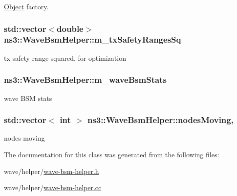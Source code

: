 \hyperlink{classns3_1_1Object}{Object} factory. 

\subsubsection[{\texorpdfstring{m\+\_\+tx\+Safety\+Ranges\+Sq}{m_txSafetyRangesSq}}]{\setlength{\rightskip}{0pt plus 5cm}std\+::vector$<$double$>$ ns3\+::\+Wave\+Bsm\+Helper\+::m\+\_\+tx\+Safety\+Ranges\+Sq\hspace{0.3cm}{\ttfamily [private]}}\hypertarget{classns3_1_1WaveBsmHelper_a44eb2f603f58383dadc9b41eae68d5c9}{}\label{classns3_1_1WaveBsmHelper_a44eb2f603f58383dadc9b41eae68d5c9}


tx safety range squared, for optimization 

\subsubsection[{\texorpdfstring{m\+\_\+wave\+Bsm\+Stats}{m_waveBsmStats}}]{ ns3\+::\+Wave\+Bsm\+Helper\+::m\+\_\+wave\+Bsm\+Stats\hspace{0.3cm}{\ttfamily [private]}}\hypertarget{classns3_1_1WaveBsmHelper_a5402fdf10496407bc439622b7698e4f7}{}\label{classns3_1_1WaveBsmHelper_a5402fdf10496407bc439622b7698e4f7}
wave B\+SM stats 
\subsubsection[{\texorpdfstring{nodes\+Moving}{nodesMoving}}]{\setlength{\rightskip}{0pt plus 5cm}std\+::vector$<$ int $>$ ns3\+::\+Wave\+Bsm\+Helper\+::nodes\+Moving\hspace{0.3cm}{\ttfamily [static]}, {\ttfamily [private]}}\hypertarget{classns3_1_1WaveBsmHelper_a281ee846d937729f0fe2a70fb23f7448}{}\label{classns3_1_1WaveBsmHelper_a281ee846d937729f0fe2a70fb23f7448}


nodes moving 



The documentation for this class was generated from the following files\+:\begin{DoxyCompactItemize}
\item 
wave/helper/\hyperlink{wave-bsm-helper_8h}{wave-\/bsm-\/helper.\+h}\item 
wave/helper/\hyperlink{wave-bsm-helper_8cc}{wave-\/bsm-\/helper.\+cc}\end{DoxyCompactItemize}

